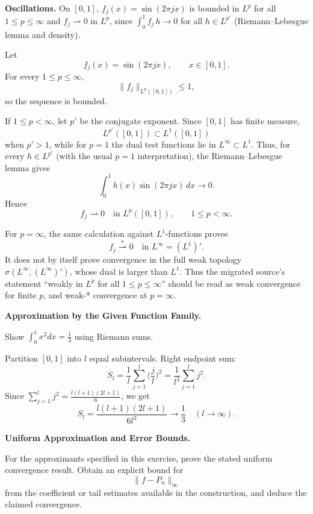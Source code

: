 \begin{problem}[CP-II-0312]
\label{prob:cp-ii-0312}
\textbf{Oscillations.}
		On $[0,1]$, $f_j(x)=\sin(2\pi j x)$ is bounded in $L^{p}$ for all $1\le p\le\infty$ and
		$f_j\rightharpoonup 0$ in $L^{p}$, since $\int_0^1 f_j\,h\to0$ for all $h\in L^{p'}$
		(Riemann--Lebesgue lemma and density).
\end{problem}

\begin{solution}
Let
\[
f_j(x)=\sin(2\pi jx),
\qquad x\in[0,1].
\]
For every \(1\le p\le\infty\),
\[
\|f_j\|_{L^p([0,1])}\le1,
\]
so the sequence is bounded.

If \(1\le p<\infty\), let \(p'\) be the conjugate exponent. Since \([0,1]\) has finite
measure,
\[
L^{p'}([0,1])\subset L^1([0,1])
\]
when \(p'>1\), while for \(p=1\) the dual test functions lie in \(L^\infty\subset L^1\).
Thus, for every \(h\in L^{p'}\) (with the usual \(p=1\) interpretation),
the Riemann--Lebesgue lemma gives
\[
\int_0^1 h(x)\sin(2\pi jx)\,dx\longrightarrow0.
\]
Hence
\[
\boxed{
f_j\rightharpoonup0
\quad\text{in }L^p([0,1]),
\qquad
1\le p<\infty.
}
\]

For \(p=\infty\), the same calculation against \(L^1\)-functions proves
\[
\boxed{
f_j\stackrel{*}{\rightharpoonup}0
\quad\text{in }L^\infty=(L^1)'.
}
\]
It does not by itself prove convergence in the full weak topology
\(\sigma(L^\infty,(L^\infty)')\), whose dual is larger than \(L^1\).
Thus the migrated source's statement ``weakly in \(L^p\) for all \(1\le p\le\infty\)''
should be read as weak convergence for finite \(p\), and weak-* convergence at \(p=\infty\).
\end{solution}


\begin{problem}[CP-II-0313]
\label{prob:cp-ii-0313}
\textbf{Approximation by the Given Function Family.}

\hspace*{1.5em}Show $\int_0^1 x^2dx=\tfrac13$ using Riemann sums.
\end{problem}

\begin{solution}
Partition $[0,1]$ into $l$ equal subintervals. Right endpoint sum:
	\[
	S_l=\frac{1}{l}\sum_{j=1}^l \Big(\frac{j}{l}\Big)^2=\frac{1}{l^3}\sum_{j=1}^l j^2.
	\]
	Since $\sum_{j=1}^l j^2=\tfrac{l(l+1)(2l+1)}{6}$, we get
	\[
	S_l=\frac{l(l+1)(2l+1)}{6l^3}\to\frac13 \quad (l\to\infty).
	\]
\end{solution}

\begin{problem}[CP-II-0314]
\label{prob:cp-ii-0314}
\textbf{Uniform Approximation and Error Bounds.}

\hspace*{1.5em}For the approximants specified in this exercise, prove the stated uniform
convergence result. Obtain an explicit bound for
\[
\|f-P_n\|_\infty
\]
from the coefficient or tail estimates available in the construction, and
deduce the claimed convergence.
\end{problem}

